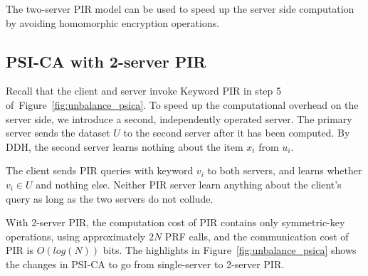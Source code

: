 \documentclass[11pt]{article} %
\newcommand{\figureref}[1]{Figure~\ref{#1}}
\newcommand{\psica}{PSI-CA\xspace}
\begin{document}
The two-server PIR model can be used to speed up the server side computation by avoiding homomorphic encryption operations.

\subsection{PSI-CA with 2-server PIR}
Recall that the client and server invoke Keyword PIR in step 5 of~\figureref{fig:unbalance_psica}. To speed up the computational overhead on the server side, we introduce a second, independently operated server. The primary server sends the dataset $U$ to the second server after it has been computed. By DDH, the second server learns nothing about the item $x_i$ from $u_i$.

The client sends PIR queries with keyword $v_i$ to both servers, and learns whether $v_i \in U$ and nothing else. Neither PIR server learn anything about the client's query as long as the two servers do not collude. 

With 2-server PIR, the computation cost of PIR contains only symmetric-key operations, using approximately $2N$ PRF calls, and the communication cost of PIR is $O(log(N))$ bits. The highlights in \figureref{fig:unbalance_psica} shows the changes in \psica to go from single-server to 2-server PIR.
\end{document}
